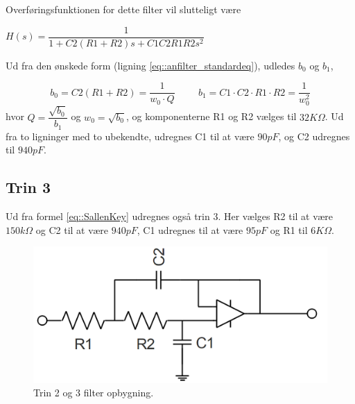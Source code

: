 Overføringsfunktionen for dette filter vil slutteligt være\\

\begin{center}
\begin{math}
H(s) = \dfrac{1}{1+C2(R1+R2) s+C1C2R1R2 s^2}
\label{eq::SallenKey}
\end{math}
\end{center} 
Ud fra den ønskede form (ligning \ref{eq::anfilter_standardeq}), udledes $b_0$ og $b_1$,

\begin{equation}
	 b_0 = C2(R1+R2) = \dfrac{1}{w_0\cdot Q} \hspace{1cm} b_1 = C1 \cdot C2 \cdot R1 \cdot R2 = \dfrac{1}{w_0^2} \nonumber
\end{equation}
hvor $Q = \dfrac{\sqrt{b_0}}{b_1}$ og $w_0 = \sqrt{b_0}$, og komponenterne R1 og R2 vælges til $32K\Omega$. Ud fra to ligninger med to ubekendte, udregnes C1 til at være $90pF$, og C2 udregnes til $940pF$.
\subsection{Trin 3}
Ud fra formel \ref{eq::SallenKey} udregnes også trin 3. Her vælges R2 til at være $150k\Omega$ og C2 til at være $940pF$, C1 udregnes til at være $95pF$ og R1 til $6K\Omega$. 


\begin{figure}[h!]
	\centering
	\includegraphics[scale=0.3]{./billeder/stage23}
	\caption{Trin 2 og 3 filter opbygning.}
	\label{fig::filter_stage2}
\end{figure}
\FloatBlock

